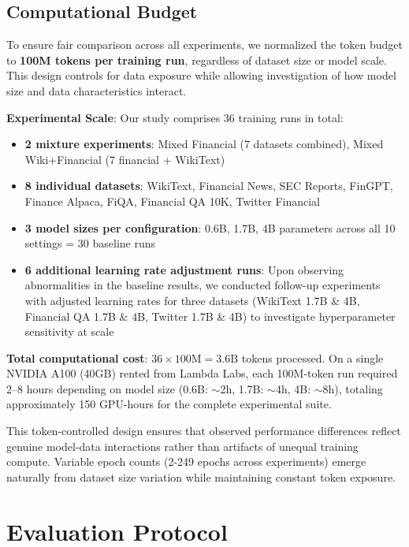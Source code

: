 \subsection{Computational Budget}

To ensure fair comparison across all experiments, we normalized the token budget to \textbf{100M tokens per training run}, regardless of dataset size or model scale. This design controls for data exposure while allowing investigation of how model size and data characteristics interact.

\textbf{Experimental Scale}: Our study comprises 36 training runs in total:
\begin{itemize}
    \item \textbf{2 mixture experiments}: Mixed Financial (7 datasets combined), Mixed Wiki+Financial (7 financial + WikiText)
    \item \textbf{8 individual datasets}: WikiText, Financial News, SEC Reports, FinGPT, Finance Alpaca, FiQA, Financial QA 10K, Twitter Financial
    \item \textbf{3 model sizes per configuration}: 0.6B, 1.7B, 4B parameters across all 10 settings = 30 baseline runs
    \item \textbf{6 additional learning rate adjustment runs}: Upon observing abnormalities in the baseline results, we conducted follow-up experiments with adjusted learning rates for three datasets (WikiText 1.7B \& 4B, Financial QA 1.7B \& 4B, Twitter 1.7B \& 4B) to investigate hyperparameter sensitivity at scale
\end{itemize}

\textbf{Total computational cost}: $36 \times 100\text{M} = 3.6\text{B}$ tokens processed. On a single NVIDIA A100 (40GB) rented from Lambda Labs, each 100M-token run required 2--8 hours depending on model size (0.6B: $\sim$2h, 1.7B: $\sim$4h, 4B: $\sim$8h), totaling approximately 150 GPU-hours for the complete experimental suite.

This token-controlled design ensures that observed performance differences reflect genuine model-data interactions rather than artifacts of unequal training compute. Variable epoch counts (2-249 epochs across experiments) emerge naturally from dataset size variation while maintaining constant token exposure.

\section{Evaluation Protocol}

